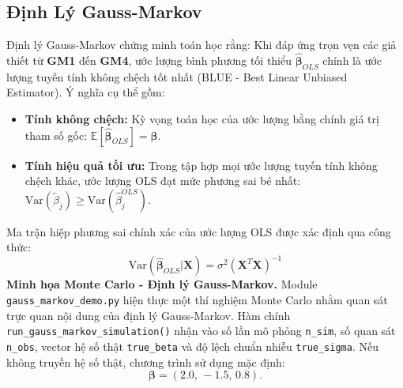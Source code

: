 \documentclass[12pt,a4paper]{report}
\begin{document}
\subsection{Định Lý Gauss-Markov}

Định lý Gauss-Markov chứng minh toán học rằng: Khi đáp ứng trọn vẹn các giả thiết từ \textbf{GM1} đến \textbf{GM4}, ước lượng bình phương tối thiểu $\hat{\boldsymbol{\beta}}_{OLS}$ chính là ước lượng tuyến tính không chệch tốt nhất (BLUE - Best Linear Unbiased Estimator). Ý nghĩa cụ thể gồm:

\begin{itemize}
    \item \textbf{Tính không chệch:} Kỳ vọng toán học của ước lượng bằng chính giá trị tham số gốc: $\mathbb{E}[\hat{\boldsymbol{\beta}}_{OLS}] = \boldsymbol{\beta}$.
    \item \textbf{Tính hiệu quả tối ưu:} Trong tập hợp mọi ước lượng tuyến tính không chệch khác, ước lượng OLS đạt mức phương sai bé nhất: $\text{Var}(\tilde{\beta}_j) \ge \text{Var}(\hat{\beta}_j^{OLS})$.
\end{itemize}

Ma trận hiệp phương sai chính xác của ước lượng OLS được xác định qua công thức:
\begin{equation}
    \text{Var}(\hat{\boldsymbol{\beta}}_{OLS}|\mathbf{X}) = \sigma^2(\mathbf{X}^T\mathbf{X})^{-1}
\end{equation}
\textbf{Minh họa Monte Carlo - Định lý Gauss-Markov.}
Module \texttt{gauss\_markov\_demo.py} hiện thực một thí nghiệm Monte Carlo nhằm quan sát trực quan nội dung của định lý Gauss-Markov. Hàm chính \texttt{run\_gauss\_markov\_simulation()} nhận vào số lần mô phỏng \texttt{n\_sim}, số quan sát \texttt{n\_obs}, vector hệ số thật \texttt{true\_beta} và độ lệch chuẩn nhiễu \texttt{true\_sigma}. Nếu không truyền hệ số thật, chương trình sử dụng mặc định:
\[
    \boldsymbol{\beta} = (2.0,\,-1.5,\,0.8).
\]
\end{document}
